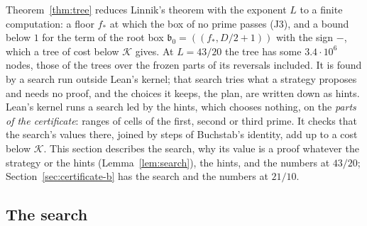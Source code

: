 \documentclass[11pt]{article}
\theoremstyle{definition}
\begin{document}
Theorem~\ref{thm:tree} reduces Linnik's theorem with the exponent $L$ to a finite computation: a floor $f_*$ at which
the box of no prime passes (J3), and a bound below $1$ for the term of the root box $\mathfrak b_0 = ((f_*, D/2 + 1))$
with the sign $-$, which a tree of cost below $\mathcal K$ gives. At $L = 43/20$ the tree has some $3.4 \cdot 10^6$
nodes, those of the trees over the frozen parts of its reversals included. It is found by a search run outside Lean's
kernel; that search tries what a strategy proposes and needs no proof, and the choices it keeps, the plan, are written
down as hints. Lean's kernel runs a search led by the hints, which chooses nothing, on the \emph{parts of the
certificate}: ranges of cells of the first, second or third prime. It checks that the search's values there, joined by
steps of Buchstab's identity, add up to a cost below $\mathcal K$. This section describes the search, why its value is
a proof whatever the strategy or the hints (Lemma~\ref{lem:search}), the hints, and the numbers at $43/20$;
Section~\ref{sec:certificate-b} has the search and the numbers at $21/10$.

\subsection{The search}\label{sec:search}
\end{document}
